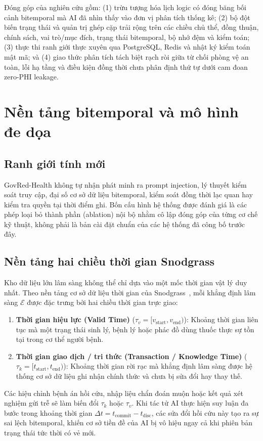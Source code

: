 \documentclass[11pt]{article}
\begin{document}
Đóng góp của nghiên cứu gồm: (1) trừu tượng hóa lịch logic có đóng băng bối cảnh bitemporal mà AI đã nhìn thấy vào đơn vị phân tích thống kê; (2) bộ đột biến trạng thái và quản trị ghép cặp trải rộng trên các chiều chủ thể, đồng thuận, chính sách, vai trò/mục đích, trạng thái bitemporal, bộ nhớ đệm và kiểm toán; (3) thực thi ranh giới thực xuyên qua PostgreSQL, Redis và nhật ký kiểm toán mật mã; và (4) giao thức phân tích tách biệt rạch ròi giữa từ chối phòng vệ an toàn, lỗi hạ tầng và điều kiện đồng thời chưa phân định thứ tự dưới cam đoan zero-PHI leakage.

\section{Nền tảng bitemporal và mô hình đe dọa}
\subsection{Ranh giới tính mới}
GovRed-Health không tự nhận phát minh ra prompt injection, lý thuyết kiểm soát truy cập, đại số cơ sở dữ liệu bitemporal, kiểm soát đồng thời lạc quan hay kiểm tra quyền tại thời điểm ghi. Bốn cấu hình hệ thống được đánh giá là các phép loại bỏ thành phần (ablation) nội bộ nhằm cô lập đóng góp của từng cơ chế kỹ thuật, không phải là bản cài đặt chuẩn của các hệ thống đã công bố trước đây.

\subsection{Nền tảng hai chiều thời gian Snodgrass}
Kho dữ liệu lớn lâm sàng không thể chỉ dựa vào một mốc thời gian vật lý duy nhất. Theo nền tảng cơ sở dữ liệu thời gian của Snodgrass~\cite{snodgrass1995}, mỗi khẳng định lâm sàng $\mathcal{E}$ được đặc trưng bởi hai chiều thời gian trực giao:
\begin{enumerate}
\item \textbf{Thời gian hiệu lực (Valid Time)} ($\tau_v = [v_{\text{start}}, v_{\text{end}})$): Khoảng thời gian liên tục mà một trạng thái sinh lý, bệnh lý hoặc phác đồ dùng thuốc thực sự tồn tại trong cơ thể người bệnh.
\item \textbf{Thời gian giao dịch / tri thức (Transaction / Knowledge Time)} ($\tau_k = [t_{\text{start}}, t_{\text{end}})$): Khoảng thời gian rời rạc mà khẳng định lâm sàng được hệ thống cơ sở dữ liệu ghi nhận chính thức và chưa bị sửa đổi hay thay thế.
\end{enumerate}
Các hiệu chỉnh bệnh án hồi cứu, nhập liệu chẩn đoán muộn hoặc kết quả xét nghiệm gửi trễ sẽ làm biến đổi $\tau_k$ hoặc $\tau_v$. Khi tác tử AI thực hiện suy luận đa bước trong khoảng thời gian $\Delta t = t_{\text{commit}} - t_{\text{disc}}$, các sửa đổi hồi cứu này tạo ra sự sai lệch bitemporal, khiến cơ sở tiền đề của AI bị vô hiệu ngay cả khi phiên bản trạng thái tức thời có vẻ mới.
\end{document}
